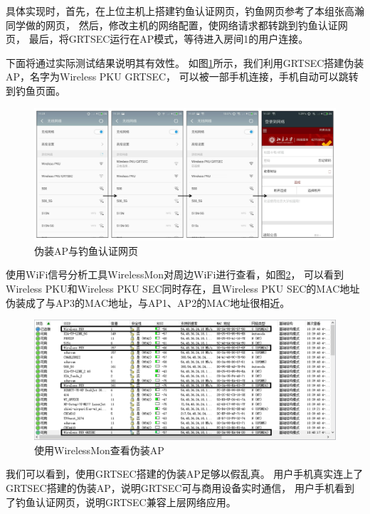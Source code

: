 		具体实现时，首先，在上位主机上搭建钓鱼认证网页，钓鱼网页参考了本组张高瀚同学做的网页\cite{zgh17wifi}，
		然后，修改主机的网络配置，使网络请求都转跳到钓鱼认证网页，
		最后，将GRTSEC运行在AP模式，等待进入房间1的用户连接。

    下面将通过实际测试结果说明其有效性。
    如图\ref{fig:envaluation_fake_ap}所示，我们利用GRTSEC搭建伪装AP，名字为Wireless PKU GRTSEC，
    可以被一部手机连接，手机自动可以跳转到钓鱼页面。
  		\begin{figure}[H]
  			\centering
  			\includegraphics[width=1.0\textwidth]{img/grtsec_fake_ap.png}
  			\caption{伪装AP与钓鱼认证网页}
  			\label{fig:envaluation_fake_ap}
  		\end{figure}

    使用WiFi信号分析工具WirelessMon\cite{wirelessmon}对周边WiFi进行查看，如图\ref{fig:envaluation_fake_ap_wirelessmon}，
    可以看到Wireless PKU和Wireless PKU SEC同时存在，且Wireless PKU SEC的MAC地址伪装成了与AP3的MAC地址，与AP1、AP2的MAC地址很相近。
  		\begin{figure}[H]
  			\centering
  			\includegraphics[width=1.0\textwidth]{img/grtsec_wirelessmon.png}
  			\caption{使用WirelessMon查看伪装AP}
  			\label{fig:envaluation_fake_ap_wirelessmon}
  		\end{figure}

    我们可以看到，使用GRTSEC搭建的伪装AP足够以假乱真。
    用户手机真实连上了GRTSEC搭建的伪装AP，说明GRTSEC可与商用设备实时通信，
    用户手机看到了钓鱼认证网页，说明GRTSEC兼容上层网络应用。

